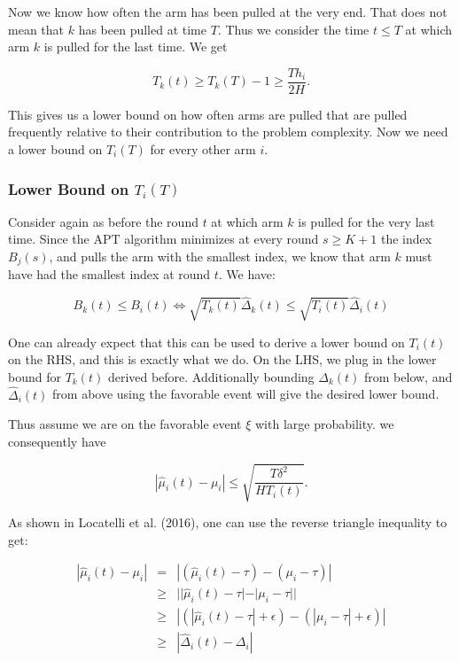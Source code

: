 \documentclass[12pt,]{article}
\begin{document}
Now we know how often the arm has been pulled at the very end. That does
not mean that \(k\) has been pulled at time \(T\). Thus we consider the
time \(t \leq T\) at which arm \(k\) is pulled for the last time. We get

\[
T_k(t) \geq T_k(T) - 1 \geq \frac{Th_i}{2H}.
\]

This gives us a lower bound on how often arms are pulled that are pulled
frequently relative to their contribution to the problem complexity. Now
we need a lower bound on \(T_i(T)\) for every other arm \(i\).

\subsubsection{\texorpdfstring{Lower Bound on
\(T_i(T)\)}{Lower Bound on T\_i(T)}}\label{lower-bound-on-t_it}

Consider again as before the round \(t\) at which arm \(k\) is pulled
for the very last time. Since the APT algorithm minimizes at every round
\(s \geq K+1\) the index \(B_j(s)\), and pulls the arm with the smallest
index, we know that arm \(k\) must have had the smallest index at round
\(t\). We have:

\[
B_k(t) \leq B_i(t) \Leftrightarrow \sqrt{T_k(t)}\hat{\Delta}_k(t) \leq \sqrt{T_i(t)} \hat{\Delta}_i(t)
\]

One can already expect that this can be used to derive a lower bound on
\(T_i(t)\) on the RHS, and this is exactly what we do. On the LHS, we
plug in the lower bound for \(T_k(t)\) derived before. Additionally
bounding \(\Delta_k(t)\) from below, and \(\hat{\Delta}_i(t)\) from
above using the favorable event will give the desired lower bound.

Thus assume we are on the favorable event \(\xi\) with large
probability. we consequently have

\[
| \hat{\mu}_i(t) - \mu_i| \leq \sqrt{\frac{T\delta^2}{HT_i(t)}}.
\]

As shown in Locatelli et al. (2016), one can use the reverse triangle
inequality to get:

\begin{align*}
|\hat{\mu}_i(t) - \mu_i| & = & |(\hat{\mu}_i(t) - \tau) - (\mu_i - \tau)| \\
& \geq & || \hat{\mu}_i(t) - \tau | - |\mu_i - \tau|| \\
& \geq & |(|\hat{\mu}_i(t) - \tau| + \epsilon) - (|\mu_i - \tau| + \epsilon)| \\
& \geq & |\hat{\Delta}_i(t) - \Delta_i|
\end{align*}
\end{document}
